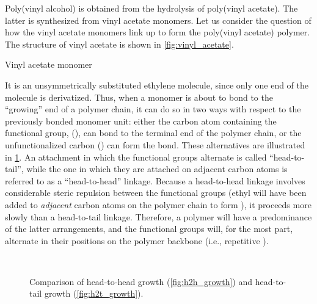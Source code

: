 Poly(vinyl alcohol) is obtained from the hydrolysis of poly(vinyl acetate). 
The latter is synthesized from vinyl acetate monomers. 
Let us consider the question of how the vinyl acetate monomers link up to form the poly(vinyl acetate) polymer. 
The structure of vinyl acetate is shown in \cref{fig:vinyl_acetate}.
\begin{marginfigure}
	\centering
	\caption{Vinyl acetate monomer}
	\label{fig:vinyl_acetate}
\end{marginfigure}
It is an unsymmetrically substituted ethylene molecule, since only one end of the molecule is derivatized. 
Thus, when a monomer is about to bond to the ``growing'' end of a polymer chain, it can do so in two ways with respect to the previously bonded monomer unit: either the carbon atom containing the functional group,  (), can bond to the terminal end of the polymer chain, or the unfunctionalized carbon () can form the bond. 
These alternatives are illustrated in \cref{fig:growth_directions}. 
An attachment in which the functional groups alternate is called ``head-to-tail'', while the one in which they are attached on adjacent carbon atoms is referred to as a ``head-to-head'' linkage. 
Because a head-to-head linkage involves considerable steric repulsion between the functional groups (ethyl will have been added to \emph{adjacent} carbon atoms on the polymer chain to form ), it proceeds more slowly than a head-to-tail linkage. 
Therefore, a polymer will have a predominance of the latter arrangements, and the functional groups will, for the most part, alternate in their positions on the polymer backbone (i.e., repetitive ). 
\begin{figure}[htb]
	\captionsetup[subfigure]{farskip=20pt,captionskip=20pt}
	 \\
	\caption{Comparison of head-to-head growth (\cref{fig:h2h_growth}) and head-to-tail growth (\cref{fig:h2t_growth}).}
	\label{fig:growth_directions}
\end{figure}

